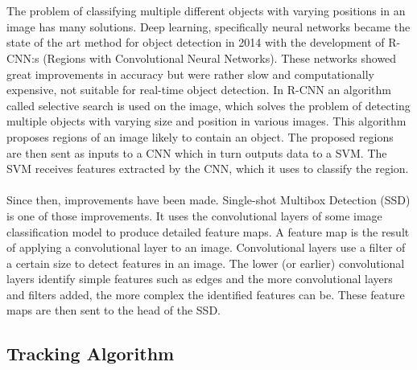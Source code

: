 \\ \\
The problem of classifying  multiple different objects with varying positions in an image has many solutions. Deep learning, specifically neural networks became the state of the art method for object detection in 2014 with the development of R-CNN:s (Regions with Convolutional Neural Networks). These networks showed great improvements in accuracy but were rather slow and computationally expensive, not suitable for real-time object detection. In R-CNN an algorithm called selective search is used on the image, which solves the problem of detecting multiple objects with varying size and position in various images. This algorithm proposes regions of an image likely to contain an object. The proposed regions are then sent as inputs to a CNN which in turn outputs data to a SVM. The SVM receives features extracted by the CNN, which it uses to classify the region. 
\\ \\
Since then, improvements have been made. Single-shot Multibox Detection (SSD) is one of those improvements. It uses the convolutional layers of some image classification model to produce detailed feature maps. A feature map is the result of applying a convolutional layer to an image. Convolutional layers use a filter of a certain size to detect features in an image. The lower (or earlier) convolutional layers identify simple features such as edges and the more convolutional layers and filters added, the more complex the identified features can be. These feature maps are then sent to the head of the SSD.

\subsection{Tracking Algorithm} \label{Tracking algorithm}

